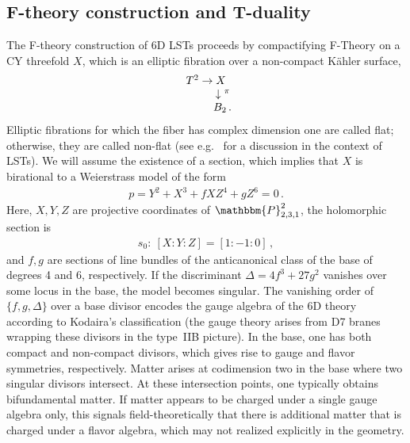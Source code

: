 \documentclass[11pt]{article}
\numberwithin{equation}{section}
\begin{document}
\subsection{F-theory construction and T-duality}
\label{sec:revFtheory}
The F-theory construction of 6D LSTs proceeds by compactifying F-Theory on a CY threefold $X$, which is an elliptic fibration over a non-compact K{\"a}hler surface,
\begin{align*}
\begin{array}{c}
    T^{2} \rightarrow X\\
    \;\;\;\;\;\;\;\;\;\;\;\downarrow^{\hspace{0.1cm}\pi}\\
    \qquad \quad B_{2}\,.
\end{array}
\end{align*}
Elliptic fibrations for which the fiber has complex dimension one are called flat; otherwise, they are called non-flat (see e.g.\ \cite{DelZotto:2022xrh} for a discussion in the context of LSTs). We will assume the existence of a section, which implies that $X$ is birational to a Weierstrass model of the form
\begin{align}
    p=Y^{2}+X^{3}+fXZ^{4}+gZ^{6}=0\,.
\end{align}
Here, $X,Y,Z$ are projective coordinates of $\mathbbm{P}^{2}_{2,3,1}$, the holomorphic section is
\begin{align}
s_{0}:~[X:Y:Z]=[1:-1:0]\,,
\end{align}
and $f,g$ are sections of line bundles of the anticanonical class of the base of degrees 4 and 6, respectively. If the discriminant $\Delta=4f^{3}+27g^{2}$ vanishes over some locus in the base, the model becomes singular. The vanishing order of $\{f,g,\Delta\}$ over a base divisor encodes the gauge algebra of the 6D theory according to Kodaira's classification (the gauge theory arises from D7 branes wrapping these divisors in the type~IIB picture). In the base, one has both compact and non-compact divisors, which gives rise to gauge and flavor symmetries, respectively. Matter arises at codimension two in the base where two singular divisors intersect. At these intersection points, one typically obtains bifundamental matter. If matter appears to be charged under a single gauge algebra only, this signals field-theoretically that there is additional matter that is charged under a flavor algebra, which may not realized explicitly in the geometry. 
\end{document}
